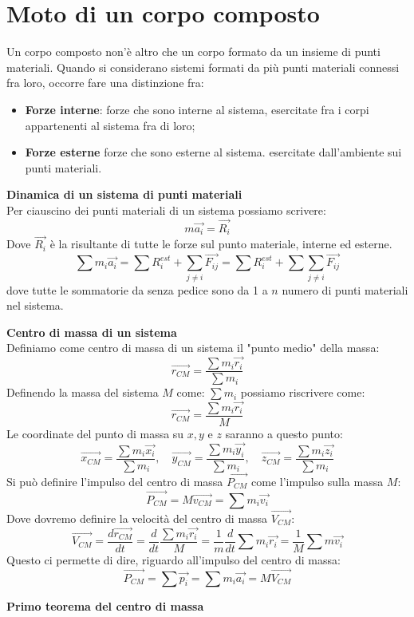 \documentclass[a4paper,12pt]{article}
\begin{document}
\section{Moto di un corpo composto}
Un corpo composto non'è altro che un corpo formato da un insieme di punti materiali. Quando si considerano sistemi
formati da più punti materiali connessi fra loro, occorre fare una distinzione fra:
\begin{itemize}
  \item \textbf{Forze interne}: forze che sono interne al sistema, esercitate fra i corpi appartenenti al sistema fra di loro;
  \item \textbf{Forze esterne} forze che sono esterne al sistema. esercitate dall'ambiente sui punti materiali.
\end{itemize}
\par\smallskip
\textbf{Dinamica di un sistema di punti materiali} \\
Per ciauscino dei punti materiali di un sistema possiamo scrivere:
$$ m\vec{a_i} = \vec{R_i} $$
Dove $\vec{R_i}$ è la risultante di tutte le forze sul punto materiale, interne ed esterne.
$$ \sum m_i\vec{a_i} = \sum R^{est}_i+ \sum_{j \neq i} \vec{F_{ij}} = \sum R^{est}_i + \sum \sum_{j \neq i} \vec{F_{ij}} $$
dove tutte le sommatorie da senza pedice sono da 1 a $n$ numero di punti materiali nel sistema.
\par\smallskip
\textbf{Centro di massa di un sistema} \\
Definiamo come centro di massa di un sistema il "punto medio" della massa:
$$ \vec{r_{CM}} = \frac{\sum m_i\vec{r_i}}{\sum m_i} $$
Definendo la massa del sistema $M$ come: $\sum m_i$ possiamo riscrivere come:
$$ \vec{r_{CM}} = \frac{\sum m_i\vec{r_i}}{M} $$
Le coordinate del punto di massa su $x,y$ e $z$ saranno a questo punto:
$$ \vec{x_{CM}} = \frac{\sum m_i\vec{x_i}}{\sum m_i}, \quad \vec{y_{CM}} = \frac{\sum m_i\vec{y_i}}{\sum m_i}, \quad \vec{z_{CM}} = \frac{\sum m_i\vec{z_i}}{\sum m_i} $$
Si può definire l'impulso del centro di massa $\vec{P_{CM}}$ come l'impulso sulla massa $M$:
$$ \vec{P_{CM}} = M\vec{v_{CM}} = \sum m_i\vec{v_i}$$
Dove dovremo definire la velocità del centro di massa $\vec{V_{CM}}$:
$$ \vec{V_{CM}} =  \frac{d\vec{r_{CM}}}{dt} = \frac{d}{dt} \frac{\sum m_i\vec{r_i}}{M} = \frac{1}{m}\frac{d}{dt}\sum m_i\vec{r_i} = \frac{1}{M} \sum m\vec{v_i} $$
Questo ci permette di dire, riguardo all'impulso del centro di massa:
$$ \vec{P_{CM}} = \sum \vec{p_i} = \sum m_i\vec{a_i} = M\vec{V_{CM}}$$
\par\smallskip
\textbf{Primo teorema del centro di massa} \\
\end{document}
